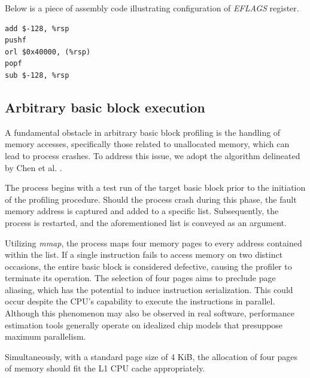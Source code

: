 Below is a piece of assembly code illustrating configuration of \textit{EFLAGS} register.

\begin{lstlisting}
add $-128, %rsp
pushf
orl $0x40000, (%rsp)
popf
sub $-128, %rsp
\end{lstlisting}

\subsection{Arbitrary basic block execution}

A fundamental obstacle in arbitrary basic block profiling is the handling of memory accesses, specifically 
those related to unallocated memory, which can lead to process crashes. To address this issue, we adopt 
the algorithm delineated by Chen et al. \cite{chenBHiveBenchmarkSuite2019}.

The process begins with a test run of the target basic block prior to the initiation of the profiling 
procedure. Should the process crash during this phase, the fault memory address is captured and added to 
a specific list. Subsequently, the process is restarted, and the aforementioned list is conveyed as an 
argument.

Utilizing \textit{mmap}, the process maps four memory pages to every address contained within the list. 
If a single instruction fails to access memory on two distinct occasions, the entire basic block is 
considered defective, causing the profiler to terminate its operation. The selection of four pages aims 
to preclude page aliasing, which has the potential to induce instruction serialization. This could occur 
despite the CPU's capability to execute the instructions in parallel. Although this phenomenon may also 
be observed in real software, performance estimation tools generally operate on idealized chip models 
that presuppose maximum parallelism.

Simultaneously, with a standard page size of 4 KiB, the allocation of four pages of memory should fit 
the L1 CPU cache appropriately. 

